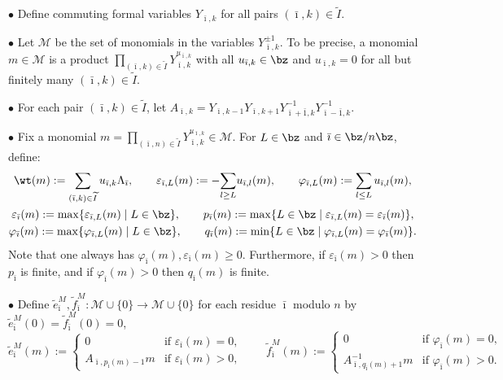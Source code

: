 $\bullet$ Def\/ine commuting formal variables $Y_{\bar \imath,k}$ for all pairs $(\bar \imath, k) \in \widetilde I$.

$\bullet$ Let $\mathcal{M}$ be the set of monomials in the variables $Y_{\bar \imath, k}^{\pm 1}$. To be precise, a monomial $m \in \mathcal{M}$ is a product $\prod\limits_{(\bar \imath, k) \in \widetilde I} Y_{\bar \imath, k}^{u_{\bar \imath, k}}$ with all $u_{\bar \imath, k} \in \bz$ and $u_{\bar \imath, k}=0$ for all but f\/initely many $(\bar \imath, k) \in \widetilde I$.

$\bullet$ For each pair $(\bar \imath, k) \in \widetilde I$, let $A_{\bar \imath,k}= Y_{\bar \imath,k-1} Y_{\bar \imath, k+1} Y_{\bar \imath+\bar 1, k}^{-1} Y_{\bar \imath-\bar 1, k}^{-1}$.

$\bullet$ Fix a monomial $m = \prod\limits_{(\bar \imath, n) \in \widetilde I} Y_{\bar \imath, k}^{u_{\bar \imath, k}} \in \mathcal{M}$. For $L \in \bz$ and $\bar \imath \in \bz / n \bz$, def\/ine:
\begin{gather*}
\wt(m):=\sum_{(\bar \imath, k) \in \widetilde I} u_{\bar \imath, k} \Lambda_{\bar \imath},
\qquad
\varepsilon_{\bar \imath,L}(m) := -{\sum_{l\geq L}}u_{\bar \imath,l}(m),
\qquad
\varphi_{\bar \imath,L}(m) := \sum_{l\leq L} u_{\bar \imath,l}(m),
\\
\varepsilon_{\bar \imath}(m) := \max\{ \varepsilon_{\bar \imath,L}(m) \mid L\in\bz\},
\qquad
p_{\bar \imath}(m) := \max\{L\in\bz\mid \varepsilon_{\bar \imath,L}(m)=\varepsilon_{\bar \imath}(m)\},
\\
\varphi_{\bar \imath}(m) := \max\{ \varphi_{\bar \imath,L}(m) \mid L\in\bz\},
\qquad
q_{\bar \imath}(m) := \min\{L\in\bz\mid \varphi_{\bar \imath,L}(m)=\varphi_{\bar \imath}(m)\}.
\end{gather*}
Note that one always has $\varphi_{\bar \imath}(m), \varepsilon_{\bar \imath}(m) \geq 0$. Furthermore, if $\varepsilon_{\bar \imath}(m)>0$ then $p_{\bar \imath}$ is f\/inite, and if $\varphi_{\bar \imath}(m)>0$ then $q_{\bar \imath}(m)$ is f\/inite.

$\bullet$ Def\/ine $\tilde{e}_{\bar \imath}^M,\tilde{f}_{\bar \imath}^M\colon \mathcal{M} \cup \{ 0 \} \to \mathcal{M} \cup\{0\}$ for each residue $\bar \imath$ modulo $n$
by $\tilde{e}_{\bar \imath}^M(0)= \tilde{f}_{\bar \imath}^M(0)=0$,
\begin{equation} \label{ef-def}
   \tilde{e}^M_{\bar \imath}(m) :=
  \begin{cases}
    0 & \text{if $\varepsilon_{\bar \imath}(m) = 0$},
    \\
   A_{\bar \imath,p_{\bar \imath}(m)-1}m & \text{if $\varepsilon_{\bar \imath}(m) > 0$},
  \end{cases}
\qquad \tilde{f}^M_{\bar \imath}(m) :=
  \begin{cases}
    0 & \text{if $\varphi_{\bar \imath}(m) = 0$},
    \\
   A_{\bar \imath,q_{\bar \imath}(m)+1}^{-1}m & \text{if $\varphi_{\bar \imath}(m) > 0$}.
  \end{cases}
\end{equation}



